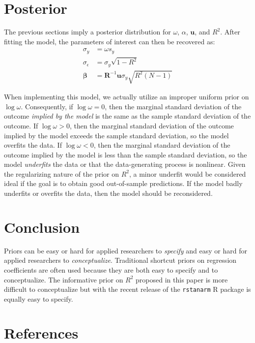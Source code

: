 \documentclass[11pt]{article}
\begin{document}
\section{Posterior}

The previous sections imply a posterior distribution for $\omega$, $\alpha$,
$\mathbf{u}$, and $R^2$. After fitting the model, the parameters of interest can
then be recovered as:
%
\begin{align*}
\sigma_y
  &= \omega s_y \\
\sigma_{\epsilon}
  &= \sigma_y \sqrt{1 - R^2} \\
\boldsymbol{\beta}
  &= \mathbf{R}^{-1} \mathbf{u} \sigma_y \sqrt{R^2 \left(N-1\right)}
\end{align*}

When implementing this model, we actually utilize an improper uniform prior on
$\log \omega$. Consequently, if $\log \omega = 0$, then the marginal standard
deviation of the outcome \emph{implied by the model} is the same as the sample
standard deviation of the outcome. If $\log \omega > 0$, then the marginal
standard deviation of the outcome implied by the model exceeds the sample
standard deviation, so the model overfits the data. If $\log \omega < 0$, then
the marginal standard deviation of the outcome implied by the model is less than
the sample standard deviation, so the model \emph{underfits} the data or that
the data-generating process is nonlinear. Given the regularizing nature of the
prior on $R^2$, a minor underfit would be considered ideal if the goal is to
obtain good out-of-sample predictions. If the model badly underfits or overfits
the data, then the model should be reconsidered.



\section{Conclusion}

Priors can be easy or hard for applied researchers to \emph{specify} and easy or
hard for applied researchers to \emph{conceptualize}. Traditional shortcut
priors on regression coefficients are often used because they are both easy to
specify and to conceptualize. The informative prior on $R^2$ proposed in this
paper is more difficult to conceptualize but with the recent release of the
{\tt rstanarm} R package is equally easy to specify.


\section*{References}
\end{document}
